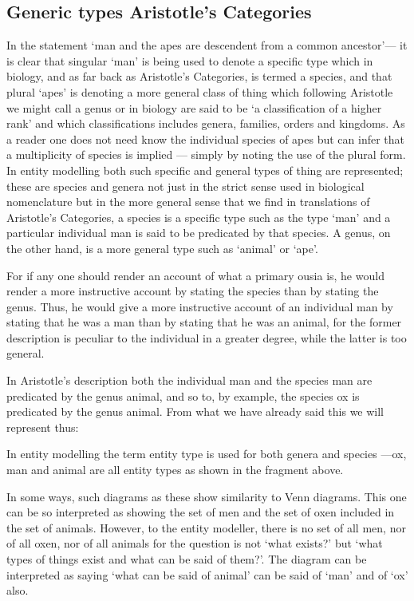 \subsection*{Generic types Aristotle's Categories}
In the statement ‘man and the apes are descendent from a common ancestor’— it is clear that singular ‘man’ is being used to denote a specific type which in biology, and as far back as Aristotle's Categories, is termed a species, and that plural ‘apes’ is denoting a more general class of thing which following Aristotle we might call a genus or in biology are said to be ‘a classification of a higher rank’ and which classifications includes genera, families, orders and kingdoms. As a reader one does not need know the individual species of apes but can infer that a multiplicity of species is implied — simply by noting the use of the plural form. In entity modelling both such specific and general types of thing are represented; these are species and genera not just in the strict sense used in biological nomenclature but in the more general sense that we find in translations of Aristotle's Categories, a species is a specific type such as the type ‘man’ and a particular individual man is said to be predicated by that species. A genus, on the other hand, is a more general type such as ‘animal’ or ‘ape’.
\begin{erquote}
For if any one should render an account of what a primary ousia is, he would render a more instructive account by stating the species than by stating the genus. Thus, he would give a more instructive account of an individual man by stating that he was a man than by stating that he was an animal, for the former description is peculiar to the individual in a greater degree, while the latter is too general.
\end{erquote}
In Aristotle's description both the individual man and the species man are predicated by the genus animal, and so to, by example, the species ox is predicated by the genus animal. From what we have already said this we will represent thus:
\begin{center}

\end{center}



In entity modelling the term entity type is used for both genera and species —ox, man and animal are all entity types as shown in the fragment above.

In some ways, such diagrams as these show similarity to Venn diagrams. This one can be so interpreted as showing the set of men and the set of oxen included in the set of animals. However, to the entity modeller, there is no set of all men, nor of all oxen, nor of all animals for the question is not ‘what exists?’ but ‘what types of things exist and what can be said of them?’. The diagram can be interpreted as saying ‘what can be said of animal’ can be said of ‘man’ and of ‘ox’ also.

